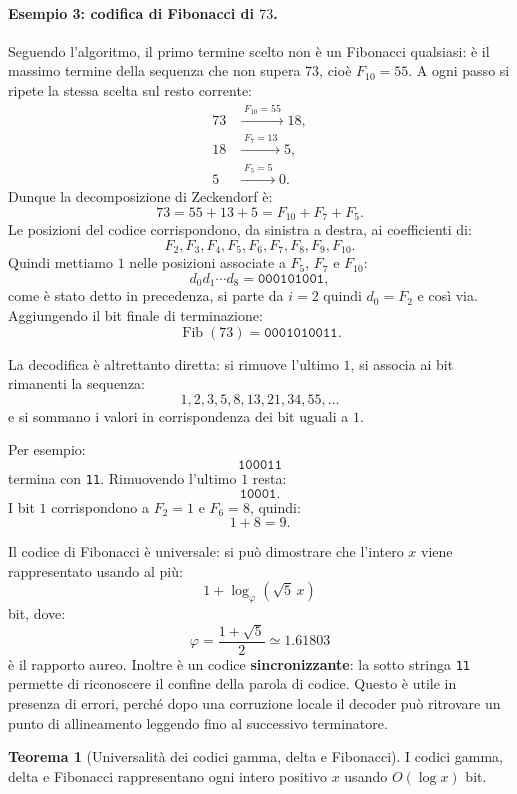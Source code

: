 \documentclass{article}
\theoremstyle{definition}
\newtheorem{theorem}{Teorema}[section] %
\numberwithin{equation}{section}
\begin{document}
\paragraph{Esempio 3: codifica di Fibonacci di $73$.}
Seguendo l'algoritmo, il primo termine scelto non è un Fibonacci qualsiasi: è il massimo termine della sequenza che non supera $73$, cioè $F_{10}=55$. A ogni passo si ripete la stessa scelta sul resto corrente:
\[
    \begin{aligned}
        73 & \xrightarrow{\;F_{10}=55\;} 18, \\
        18 & \xrightarrow{\;F_7=13\;} 5,     \\
        5  & \xrightarrow{\;F_5=5\;} 0.
    \end{aligned}
\]
Dunque la decomposizione di Zeckendorf è:
\[
    73=55+13+5
    =
    F_{10}+F_7+F_5.
\]
Le posizioni del codice corrispondono, da sinistra a destra, ai coefficienti di:
\[
    F_2,F_3,F_4,F_5,F_6,F_7,F_8,F_9,F_{10}.
\]
Quindi mettiamo $1$ nelle posizioni associate a $F_5$, $F_7$ e $F_{10}$:
\[
    d_0d_1\cdots d_8=\texttt{000101001},
\]
come è stato detto in precedenza, si parte da $i=2$ quindi $d_0=F_2$ e così via. Aggiungendo il bit finale di terminazione:
\[
    \operatorname{Fib}(73)=\texttt{0001010011}.
\]

La decodifica è altrettanto diretta: si rimuove l'ultimo $1$, si associa ai bit rimanenti la sequenza:
\[
    1,2,3,5,8,13,21,34,55,\ldots
\]
e si sommano i valori in corrispondenza dei bit uguali a $1$.

Per esempio:
\[
    \texttt{100011}
\]
termina con \texttt{11}. Rimuovendo l'ultimo $1$ resta:
\[
    \texttt{10001}.
\]
I bit $1$ corrispondono a $F_2=1$ e $F_6=8$, quindi:
\[
    1+8=9.
\]

Il codice di Fibonacci è universale: si può dimostrare che l'intero $x$ viene rappresentato usando al più:
\begin{equation}\label{eq:fibonacci_length_bound}
    1+\log_{\varphi}\left(\sqrt{5}\,x\right)
\end{equation}
bit, dove:
\[
    \varphi=\frac{1+\sqrt{5}}{2}\simeq 1.61803
\]
è il rapporto aureo. Inoltre è un codice \textbf{sincronizzante}: la sotto stringa \texttt{11} permette di riconoscere il confine della parola di codice. Questo è utile in presenza di errori, perché dopo una corruzione locale il decoder può ritrovare un punto di allineamento leggendo fino al successivo terminatore.

\begin{theorem}[Universalità dei codici gamma, delta e Fibonacci]
    I codici gamma, delta e Fibonacci rappresentano ogni intero positivo $x$ usando $O(\log x)$ bit.
\end{theorem}
\end{document}
